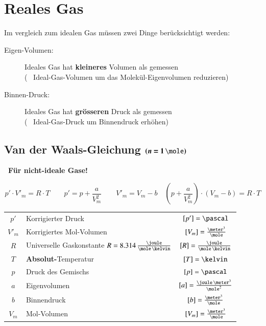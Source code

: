 \section{Reales Gas}

Im vergleich zum idealen Gas müssen zwei Dinge berücksichtigt werden:

\medskip

\begin{description}
	\item[Eigen-Volumen:] Ideales Gas hat \textbf{kleineres} Volumen als gemessen \\
		( \textrightarrow\ Ideal-Gas-Volumen um das Molekül-Eigenvolumen reduzieren)
	\item[Binnen-Druck:] Ideales Gas hat \textbf{grösseren} Druck als gemessen \\
		( \textrightarrow\ Ideal-Gas-Druck um Binnendruck erhöhen) 
\end{description}


\subsection[Van der Waals-Gleichung (1 mol)]{Van der Waals-Gleichung $\bm{(n = 1 \, \mole)}$}

\textbf{\textrightarrow\ Für nicht-ideale Gase!} \vspace{-1em}

\[\boxed{ p' \cdot V'_m = R \cdot T } \qquad \boxed{ p' = p + \frac{a}{V_m^2} } \qquad 
\boxed{ V'_m = V_m - b } \quad \boxed{\left(p+\frac{a}{V_m^2}\right) \cdot (V_m - b) = R \cdot T}\]


\renewcommand{\arraystretch}{1.3}
\begin{tabular}{c l c}
	$p'$ 	& Korrigierter Druck 														& $[p'] = \pascal$ 								\\
	$V'_m$ 	& Korrigiertes Mol-Volumen 													& $[V_m] = \frac{\meter^3}{\mole}$ 				\\
	$R$		& Universelle Gaskonstante $R = 8.314 \, \frac{\joule}{\mole \, \kelvin}$ 	& $[R] = \frac{\joule}{\mole \, \kelvin}$ 		\\
	$T$ 	& \textbf{Absolut-}Temperatur		 										& $[T] = \kelvin$ 								\\
	$p$ 	& Druck des Gemischs 														& $[p] = \pascal$ 								\\
	$a$ 	& Eigenvolumen 																& $[a] = \frac{\joule \, \meter^3}{\mole^2}$ 	\\
	$b$ 	& Binnendruck 																& $[b] = \frac{\meter^3}{\mole}$ 				\\
	$V_m$ 	& Mol-Volumen 																& $[V_m] = \frac{\meter^3}{\mole}$				
\end{tabular}
\renewcommand{\arraystretch}{1}


